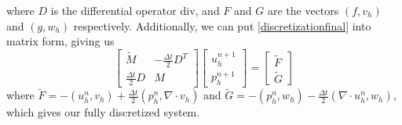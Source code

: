 \documentclass[11pt]{article}
\newcommand{\divv}{\mathrm{div}}
\begin{document}
where $D$ is the differential operator $\divv$, and $F$ and $G$ are the vectors $(f,v_h)$ and $(g,w_h)$ respectively. Additionally, we can put \eqref{discretizationfinal} into matrix form, giving us
\begin{equation}\label{coeffoperator}
\begin{bmatrix}
\tilde{M} & -\frac{\Delta t}{2}D^T \\
\frac{\Delta t}{2}D & M
\end{bmatrix}
\begin{bmatrix}
u^{n+1}_h \\
p^{n+1}_h
\end{bmatrix}
=
\begin{bmatrix}
\tilde{F}\\
\tilde{G}
\end{bmatrix}
\end{equation}
where $\tilde{F} = -\left(u^n_h, v_h\right) +\frac{\Delta t}{2}\left(p^n_h,\nabla \cdot v_h\right)$ and $\tilde{G} = -\left(p^n_h,w_h\right) - \frac{\Delta t}{2}\left(\nabla \cdot u^n_h,w_h\right)$, which gives our fully discretized system.
\end{document}
